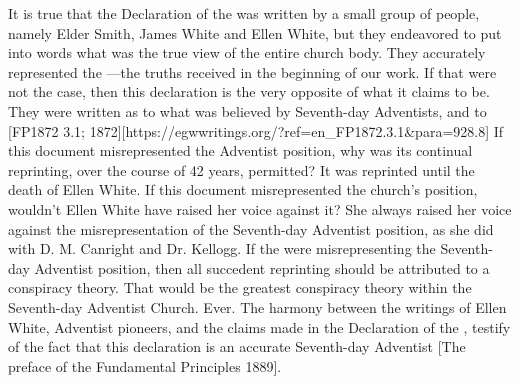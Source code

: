 It is true that the Declaration of the  was written by a small group of people, namely Elder Smith, James White and Ellen White, but they endeavored to put into words what was the true view of the entire church body. They accurately represented the —the truths received in the beginning of our work. If that were not the case, then this declaration is the very opposite of what it claims to be. They were written  as to what was believed by Seventh-day Adventists,  and to [FP1872 3.1; 1872][https://egwwritings.org/?ref=en\_FP1872.3.1&para=928.8] If this document misrepresented the Adventist position, why was its continual reprinting, over the course of 42 years, permitted? It was reprinted until the death of Ellen White. If this document misrepresented the church’s position, wouldn’t Ellen White have raised her voice against it? She always raised her voice against the misrepresentation of the Seventh-day Adventist position, as she did with D. M. Canright and Dr. Kellogg. If the  were misrepresenting the Seventh-day Adventist position, then all succedent reprinting should be attributed to a conspiracy theory. That would be the greatest conspiracy theory within the Seventh-day Adventist Church. Ever. The harmony between the writings of Ellen White, Adventist pioneers, and the claims made in the Declaration of the , testify of the fact that this declaration is an accurate  Seventh-day Adventist [The preface of the Fundamental Principles 1889].


